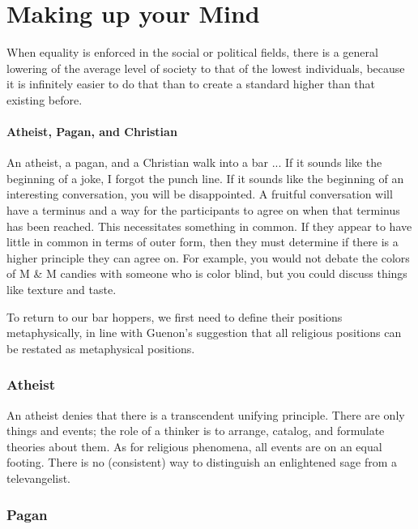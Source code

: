 \section{Making up your Mind}

\begin{quotex}
When equality is enforced in the social or political fields, there is a general lowering of the average level of society to that of the lowest individuals, because it is infinitely easier to do that than to create a standard higher than that existing before.
\end{quotex}


\paragraph{Atheist, Pagan, and Christian}


An atheist, a pagan, and a Christian walk into a bar ... If it sounds like the beginning of a joke, I forgot the punch line. If it sounds like the beginning of an interesting conversation, you will be disappointed. A fruitful conversation will have a terminus and a way for the participants to agree on when that terminus has been reached. This necessitates something in common. If they appear to have little in common in terms of outer form, then they must determine if there is a higher principle they can agree on. For example, you would not debate the colors of M \& M candies with someone who is color blind, but you could discuss things like texture and taste.

To return to our bar hoppers, we first need to define their positions metaphysically, in line with Guenon's suggestion that all religious positions can be restated as metaphysical positions.

\subsubsection{Atheist}


An atheist denies that there is a transcendent unifying principle. There are only things and events; the role of a thinker is to arrange, catalog, and formulate theories about them. As for religious phenomena, all events are on an equal footing. There is no (consistent) way to distinguish an enlightened sage from a televangelist.

\subsubsection{Pagan}


